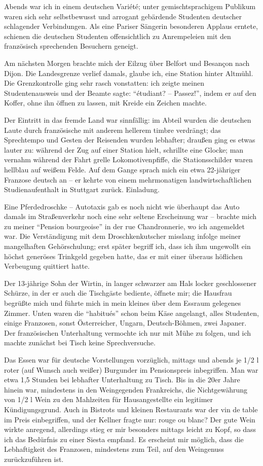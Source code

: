 Abends war ich in einem deutschen Variété; unter gemischtsprachigem Publikum waren sich sehr selbstbewusst und arrogant gebärdende Studenten deutscher schlagender Verbindungen. Als eine Pariser Sängerin besonderen Applaus erntete, schienen die deutschen Studenten offensichtlich zu Anrempeleien mit den französisch sprechenden Besuchern geneigt.

Am nächsten Morgen brachte mich der Eilzug über Belfort und Besançon nach Dijon. Die Landesgrenze verlief damals, glaube ich, eine Station hinter Altmühl. Die Grenzkontrolle ging sehr rasch vonstatten: ich zeigte meinen Studentenausweis und der Beamte sagte: \enquote{étudiant? -- Passez!}, indem er auf den Koffer, ohne ihn öffnen zu lassen, mit Kreide ein Zeichen machte.

Der Eintritt in das fremde Land war sinnfällig: im Abteil wurden die deutschen Laute durch französische mit anderem hellerem timbre verdrängt; das Sprechtempo und Gesten der Reisenden wurden lebhafter; draußen ging es etwas lauter zu: während der Zug auf einer Station hielt, schrillte eine Glocke; man vernahm während der Fahrt grelle Lokomotivenpfiffe, die Stationsschilder waren hellblau auf weißem Felde. Auf dem Gange sprach mich ein etwa 22-jähriger Franzose deutsch an -- er kehrte von einem mehrmonatigen landwirtschaftlichen Studienaufenthalt in Stuttgart zurück. Einladung.

Eine Pferdedroschke -- Autotaxis gab es noch nicht wie überhaupt das Auto damals im Straßenverkehr noch eine sehr seltene Erscheinung war -- brachte mich zu meiner \enquote{Pension bourgeoise} in der rue Chandronnerie, wo ich angemeldet war. Die Verständigung mit dem Droschkenkutscher misslang infolge meiner mangelhaften Gehörschulung; erst später begriff ich, dass ich ihm ungewollt ein höchst generöses Trinkgeld gegeben hatte, das er mit einer überaus höflichen Verbeugung quittiert hatte.

Der 13-jährige Sohn der Wirtin, in langer schwarzer am Hals locker geschlossener Schürze, in der er auch die Tischgäste bediente, öffnete mir; die Hausfrau begrüßte mich und führte mich in mein kleines über dem Essraum gelegenes Zimmer. Unten waren die \enquote{habitués} schon beim Käse angelangt, alles Studenten, einige Franzosen, sonst Österreicher, Ungarn, Deutsch-Böhmen, zwei Japaner. Der französischen Unterhaltung vermochte ich nur mit Mühe zu folgen, und ich machte zunächst bei Tisch keine Sprechversuche.

Das Essen war für deutsche Vorstellungen vorzüglich, mittags und abends je 1/2 l roter (auf Wunsch auch weißer) Burgunder im Pensionspreis inbegriffen. Man war etwa 1,5 Stunden bei lebhafter Unterhaltung zu Tisch. Bis in die 20er Jahre hinein war, mindestens in den Weingegenden Frankreichs, die Nichtgewährung von 1/2 l Wein zu den Mahlzeiten für Hausangestellte ein legitimer Kündigungsgrund. Auch in Bistrots und kleinen Restaurants war der vin de table im Preis einbegriffen, und der Kellner fragte nur: rouge ou blanc? Der gute Wein wirkte anregend, allerdings stieg er mir besonders mittags leicht zu Kopf, so dass ich das Bedürfnis zu einer Siesta empfand. Es erscheint mir möglich, dass die Lebhaftigkeit des Franzosen, mindestens zum Teil, auf den Weingenuss zurückzuführen ist.

